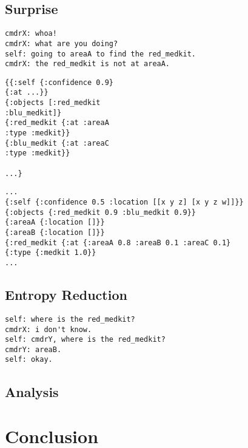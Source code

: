 \documentclass[12pt]{article}
\begin{document}
\subsection{Surprise}

\begin{verbatim}
cmdrX: whoa!
cmdrX: what are you doing?
self: going to areaA to find the red_medkit.
cmdrX: the red_medkit is not at areaA.
\end{verbatim}

\begin{verbatim}
{{:self {:confidence 0.9}
{:at ...}}
{:objects [:red_medkit
:blu_medkit]}
{:red_medkit {:at :areaA
:type :medkit}}
{:blu_medkit {:at :areaC
:type :medkit}}

...}
\end{verbatim}

\begin{verbatim}
...
{:self {:confidence 0.5 :location [[x y z] [x y z w]]}}
{:objects {:red_medkit 0.9 :blu_medkit 0.9}}
{:areaA {:location []}}
{:areaB {:location []}}
{:red_medkit {:at {:areaA 0.8 :areaB 0.1 :areaC 0.1}
{:type {:medkit 1.0}}
...
\end{verbatim}

\subsection{Entropy Reduction}
\begin{verbatim}
self: where is the red_medkit?
cmdrX: i don't know.
self: cmdrY, where is the red_medkit?
cmdrY: areaB.
self: okay.
\end{verbatim}


\subsection{Analysis}
\label{sec:analysis}

\section{Conclusion}
\label{sec:conclusion}
\end{document}
